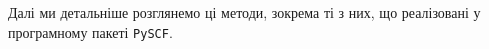Далі ми детальніше розглянемо ці методи,
зокрема ті з них, що реалізовані у програмному пакеті \texttt{PySCF}.







%
%
%
%
%
%
